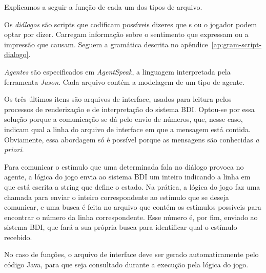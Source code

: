 Explicamos a seguir a função de cada um dos tipos de arquivo.

Os \emph{diálogos} são scripts que codificam possíveis dizeres que
\npc{}s ou o jogador podem optar por dizer. Carregam informação sobre
o sentimento que expressam ou a impressão que causam. Seguem a
gramática descrita no apêndice~\ref{ap:gram-script-dialogo}.

\emph{Agentes} são especificados em \emph{AgentSpeak}, a linguagem
interpretada pela ferramenta \emph{Jason}. Cada arquivo contém a
modelagem de um tipo de agente.

Os três últimos itens são arquivos de interface, usados para
leitura pelos processos de renderização e de interpretação do sistema
BDI. Optou-se por essa solução porque a comunicação se dá pelo envio de
números, que, nesse caso, indicam qual a linha do arquivo de interface
em que a mensagem está contida. Obviamente, essa abordagem só é
possível porque as mensagens são conhecidas \emph{a priori}.

Para comunicar o estímulo que uma determinada fala no diálogo provoca
no agente, a lógica do jogo envia ao sistema BDI um inteiro indicando
a linha em que está escrita a string que define o estado. Na prática,
a lógica do jogo faz uma chamada para enviar o inteiro correspondente
ao estímulo que se deseja comunicar, e uma busca é feita no arquivo
que contém os estímulos possíveis para encontrar o número da linha
correspondente. Esse número é, por fim, enviado ao sistema BDI, que
fará a sua própria busca para identificar qual o estímulo recebido.

No caso de funções, o arquivo de interface deve ser gerado
automaticamente pelo código Java, para que seja consultado durante a
execução pela lógica do jogo.

